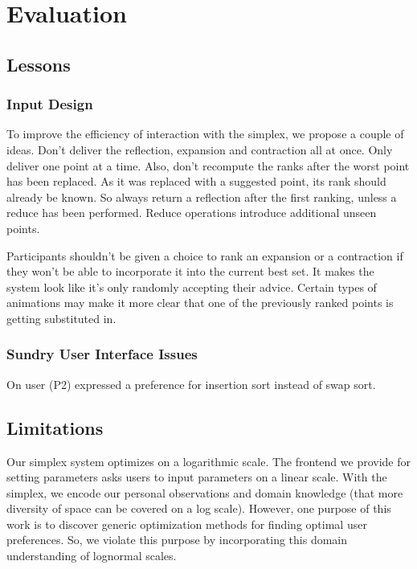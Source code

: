 %
\section{Evaluation}

\subsection{Lessons}

\subsubsection{Input Design}

To improve the efficiency of interaction with the simplex, we propose a couple of ideas.
Don't deliver the reflection, expansion and contraction all at once.
Only deliver one point at a time.
Also, don't recompute the ranks after the worst point has been replaced.
As it was replaced with a suggested point, its rank should already be known.
So always return a reflection after the first ranking, unless a reduce has been performed.
Reduce operations introduce additional unseen points.

Participants shouldn't be given a choice to rank an expansion or a contraction if they won't be able to incorporate it into the current best set.
It makes the system look like it's only randomly accepting their advice.
Certain types of animations may make it more clear that one of the previously ranked points is getting substituted in.

\subsubsection{Sundry User Interface Issues}

On user (P2) expressed a preference for insertion sort instead of swap sort.

\subsection{Limitations}

Our simplex system optimizes on a logarithmic scale.
The frontend we provide for setting parameters asks users to input parameters on a linear scale.
With the simplex, we encode our personal observations and domain knowledge (that more diversity of space can be covered on a log scale).
However, one purpose of this work is to discover generic optimization methods for finding optimal user preferences.
So, we violate this purpose by incorporating this domain understanding of lognormal scales.
